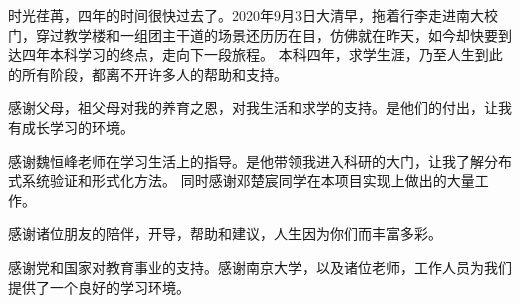 \documentclass[
    type = bachelor,
    degree = academic,
    twoside,
    fontset = win,
    decl-page
]
{njuthesis}
\begin{document}
\begin{acknowledgement}
时光荏苒，四年的时间很快过去了。2020年9月3日大清早，拖着行李走进南大校门，穿过教学楼和一组团主干道的场景还历历在目，仿佛就在昨天，如今却快要到达四年本科学习的终点，走向下一段旅程。
本科四年，求学生涯，乃至人生到此的所有阶段，都离不开许多人的帮助和支持。

感谢父母，祖父母对我的养育之恩，对我生活和求学的支持。是他们的付出，让我有成长学习的环境。

感谢魏恒峰老师在学习生活上的指导。是他带领我进入科研的大门，让我了解分布式系统验证和形式化方法。
同时感谢邓楚宸同学在本项目实现上做出的大量工作。

感谢诸位朋友的陪伴，开导，帮助和建议，人生因为你们而丰富多彩。

感谢党和国家对教育事业的支持。感谢南京大学，以及诸位老师，工作人员为我们提供了一个良好的学习环境。

\end{acknowledgement}
\end{document}
